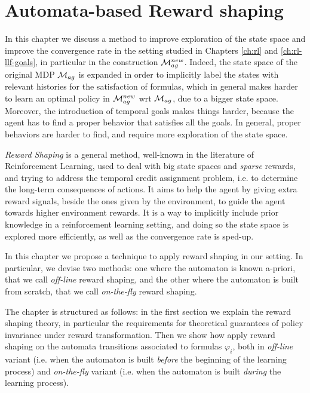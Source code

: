 \chapter{Automata-based Reward shaping}\label{ch:reward-shaping}
In this chapter we discuss a method to improve exploration of the state space and improve the convergence rate in the setting studied in Chapters \ref{ch:rl} and \ref{ch:rl-llf-goals}, in particular in the construction $\mathcal{M}_{ag}^{new}$. 
Indeed, the state space of the original MDP $\mathcal{M}_{ag}$ is expanded in order to implicitly label the states with relevant histories for the satisfaction of \LLf formulas, which in general makes harder to learn an optimal policy in $\mathcal{M}_{ag}^{new}$ wrt $\mathcal{M}_{ag}$, due to a bigger state space. 
Moreover, the introduction of temporal goals makes things harder, because the agent has to find a proper behavior that satisfies all the goals. In general, proper behaviors are harder to find, and require more exploration of the state space.

\emph{Reward Shaping} is a general method, well-known in the literature of Reinforcement Learning, used to deal with big state spaces and \emph{sparse} rewards, and trying to address the temporal
credit assignment problem, i.e. to determine
the long-term consequences of actions. It aims to help the agent by giving extra reward signals, beside the ones given by the environment, to guide the agent towards higher environment rewards. It is a way to implicitly include prior knowledge in a reinforcement learning setting, and doing so the state space is explored more efficiently, as well as the convergence rate is sped-up.

In this chapter we propose a technique to apply reward shaping in our setting. In particular, we devise two methods: one where the automaton is known a-priori, that we call \emph{off-line} reward shaping, and the other where the automaton is built from scratch, that we call \emph{on-the-fly} reward shaping.

The chapter is structured as follows: in the first section we explain the reward shaping theory, in particular the requirements for theoretical guarantees of policy invariance under reward transformation. Then we show how apply reward shaping on the automata transitions associated to \LLf formulas $\varphi_i$, both in \emph{off-line} variant (i.e. when the automaton is built \emph{before} the beginning of the learning process)  and \emph{on-the-fly} variant (i.e. when the automaton is built \emph{during} the learning process).
 
